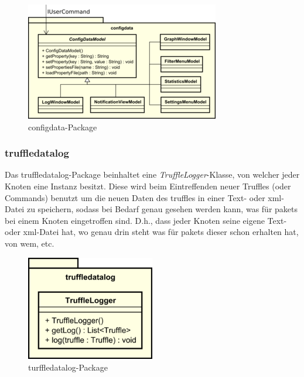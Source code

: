     \begin{figure}[H]
      \centering
      \includegraphics[width=\textwidth]{../diagramimages/configdata.png}
      \caption{configdata-Package}
    \end{figure}


    \subsubsection{truffledatalog}
    \label{subsubsec:graphlog}

    Das truffledatalog-Package beinhaltet eine \textit{TruffleLogger}-Klasse, von
    welcher jeder Knoten eine Instanz besitzt. Diese wird beim Eintreffenden neuer Truffles
    (oder Commands) benutzt um die neuen Daten des \glspl{truffle} in einer Text- oder xml-Datei zu speichern,
    sodass bei Bedarf genau gesehen werden kann, was für \glspl{paket} bei einem
    Knoten eingetroffen sind. D.h., dass jeder Knoten seine eigene Text- oder xml-Datei
    hat, wo genau drin steht was für \glspl{paket} dieser schon erhalten hat,
    von wem, etc.

    \begin{figure}[H]
      \centering
      \includegraphics[width=0.5\textwidth]{../diagramimages/truffledatalog.png}
      \caption{turffledatalog-Package}
    \end{figure}
